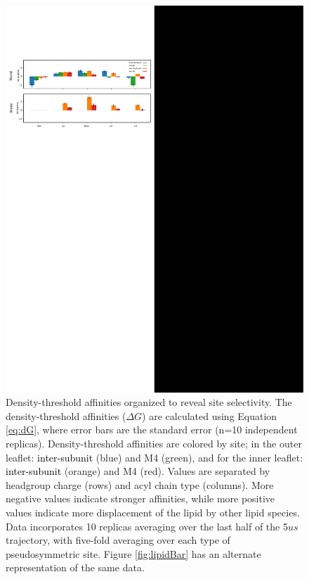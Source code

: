 \documentclass[%
 aip,
 amsmath,amssymb,
 preprint,%
]{revtex4-1}\usepackage{setspace}
\newcommand{\newaffinities}{density-threshold affinities}
\newcommand{\Newaffinities}{Density-threshold affinities}
\newcommand{\liam}[1]{\textcolor{black}{#1}}
\begin{document}

\begin{figure}[!h]
	\center
	\includegraphics[width=\linewidth]{Protein_centric.pdf}
	\caption{{\Newaffinities{} organized to reveal site selectivity.} The \newaffinities{} ($\Delta G$) are calculated using Equation \ref{eq:dG}, where error bars are the standard error (n=10 independent replicas).  \Newaffinities{} are colored by site; in the outer leaflet:  \liam{inter-subunit} (blue) and  M4 (green), and for the inner leaflet: \liam{inter-subunit} (orange) and M4 (red). Values are separated by headgroup charge (rows) and acyl chain type (columns). More negative values indicate stronger affinities, while more positive values indicate more displacement of the lipid by other lipid species. Data incorporates 10 replicas averaging over the last half of the 5$us$ trajectory, with five-fold averaging over each type of pseudosymmetric site. Figure \ref{fig:lipidBar} has an alternate representation of the same data.  }  %
	\label{fig:proBar}
\end{figure}
\end{document}
